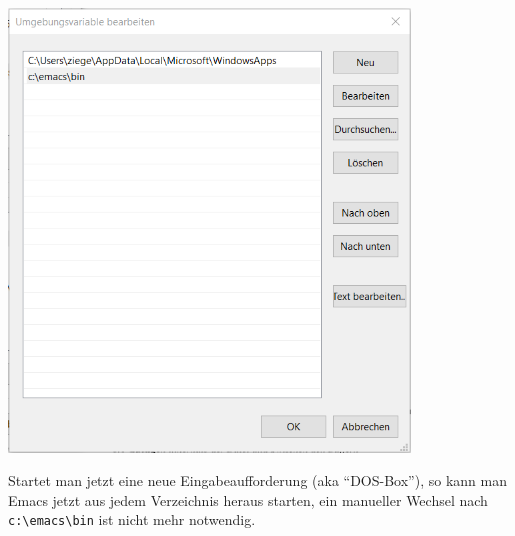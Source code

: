 \documentclass[12pt,ngerman]{scrbook}
\begin{document}
\begin{tcolorbox}[title={Anpassung der PATH-Variablen unter Windows},breakable]
\begin{enumerate}
\begin{center}
\includegraphics[width=0.8\textwidth]{Bilder/path-02}
\end{center}


\end{enumerate}

Startet man jetzt eine neue Eingabeaufforderung (aka \enquote{DOS-Box}), so kann man Emacs jetzt aus jedem Verzeichnis heraus starten, ein manueller Wechsel nach \texttt{c:\textbackslash emacs\textbackslash bin} ist nicht mehr notwendig.

\end{tcolorbox}
\end{document}
